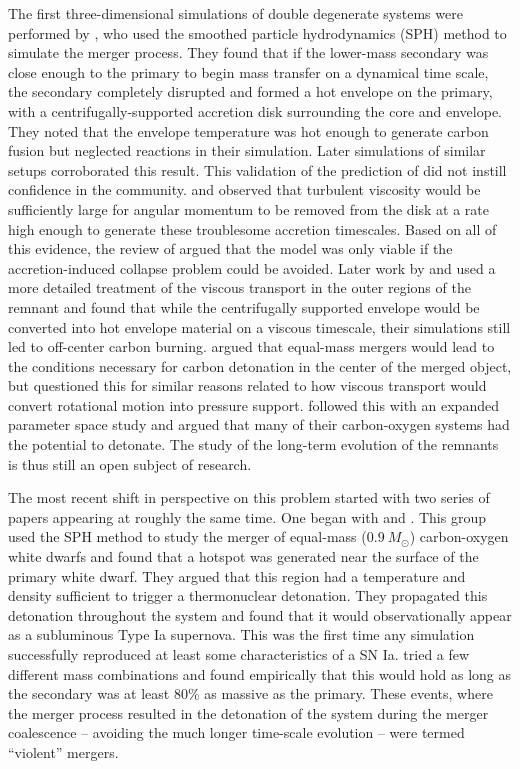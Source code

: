 \documentclass[12pt,preprint]{aastex}
\begin{document}
The first three-dimensional simulations of double degenerate systems were performed by \citet{benz:1990}, who used the smoothed particle hydrodynamics (SPH) method to simulate the merger process. They found that if the lower-mass secondary was close enough to the primary to begin mass transfer on a dynamical time scale, the secondary completely disrupted and formed a hot envelope on the primary, with a centrifugally-supported accretion disk surrounding the core and envelope. They noted that the envelope temperature was hot enough to generate carbon fusion but neglected reactions in their simulation. Later simulations of similar setups \citep{rasio_shapiro:1995,yoon:2007,loren-aguilar:2009,raskin:2012} corroborated this result. This validation of the prediction of \cite{tutukov_yungelson:1979} did not instill confidence in the community. \cite{mochkovitch_livio:1990} and \cite{livio:2000} observed that turbulent viscosity would be sufficiently large for angular momentum to be removed from the disk at a rate high enough to generate these troublesome accretion timescales. Based on all of this evidence, the review of \cite{hillebrandtniemeyer2000} argued that the model was only viable if the accretion-induced collapse problem could be avoided. Later work by \cite{shen:2012} and \cite{schwab:2012} used a more detailed treatment of the viscous transport in the outer regions of the remnant and found that while the centrifugally supported envelope would be converted into hot envelope material on a viscous timescale, their simulations still led to off-center carbon burning. \cite{vankerkwijk:2010} argued that equal-mass mergers would lead to the conditions necessary for carbon detonation in the center of the merged object, but \cite{shen:2012} questioned this for similar reasons related to how viscous transport would convert rotational motion into pressure support. \cite{zhu:2013} followed this with an expanded parameter space study and argued that many of their carbon-oxygen systems had the potential to detonate. The study of the long-term evolution of the remnants is thus still an open subject of research.

The most recent shift in perspective on this problem started with two series of papers appearing at roughly the same time. One began with \cite{pakmor:2010} and \cite{pakmor:2011}. This group used the SPH method to study the merger of equal-mass ($0.9\ M_\odot$) carbon-oxygen white dwarfs and found that a hotspot was generated near the surface of the primary white dwarf. They argued that this region had a temperature and density sufficient to trigger a thermonuclear detonation. They propagated this detonation throughout the system and found that it would observationally appear as a subluminous Type Ia supernova. This was the first time any simulation successfully reproduced at least some characteristics of a SN Ia. \cite{pakmor:2011} tried a few different mass combinations and found empirically that this would hold as long as the secondary was at least 80\% as massive as the primary. These events, where the merger process resulted in the detonation of the system during the merger coalescence -- avoiding the much longer time-scale evolution -- were termed ``violent'' mergers.
\end{document}
